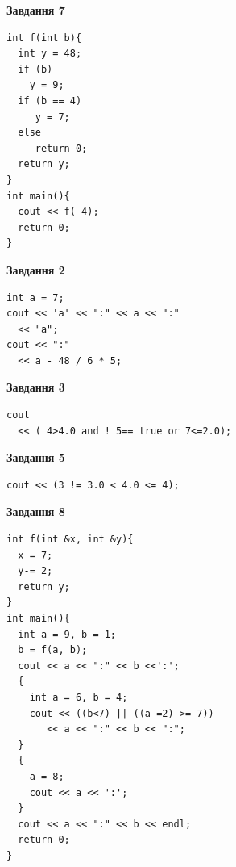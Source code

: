\documentclass[12pt, ukrainian]{article}
\begin{document}
{\begin {large}
\begin{minipage}[t]{7.0cm}
\begin{center}
\textbf{Завдання 7}
\end{center}
\vspace{-8mm}

\begin{verbatim}
int f(int b){
  int y = 48;
  if (b)
    y = 9;
  if (b == 4)
     y = 7;
  else
     return 0;
  return y;
}
int main(){
  cout << f(-4);
  return 0;
}
\end{verbatim}

\end{minipage}
\vline \hspace{1mm}
\begin{minipage}[t]{11.0cm}

\begin{center}
\textbf{Завдання 2}
\end{center}
\vspace{-8mm}

\begin{verbatim}
int a = 7;
cout << 'a' << ":" << a << ":" 
  << "a";
cout << ":" 
  << a - 48 / 6 * 5;
\end{verbatim}



\begin{center}
\textbf{Завдання 3}
\end{center}
\vspace{-8mm}

\begin{verbatim}
cout 
  << ( 4>4.0 and ! 5== true or 7<=2.0);
\end{verbatim}



\begin{center}
\textbf{Завдання 5}
\end{center}
\vspace{-8mm}

\begin{verbatim}
cout << (3 != 3.0 < 4.0 <= 4);
\end{verbatim}



\begin{center}
\textbf{Завдання 8}
\end{center}
\vspace{-8mm}

\begin{verbatim}
int f(int &x, int &y){
  x = 7;
  y-= 2;
  return y;
}
int main(){
  int a = 9, b = 1;
  b = f(a, b);
  cout << a << ":" << b <<':';
  {
    int a = 6, b = 4;
    cout << ((b<7) || ((a-=2) >= 7))
       << a << ":" << b << ":";
  }
  {
    a = 8;
    cout << a << ':';
  }
  cout << a << ":" << b << endl;
  return 0;
}
\end{verbatim}


\end{minipage}
\end{large}}
\end{document}

